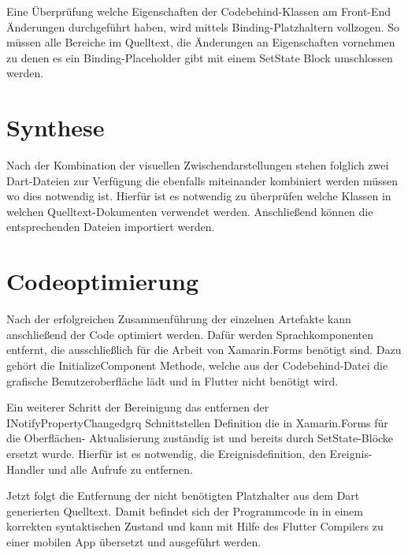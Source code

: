 Eine Überprüfung welche Eigenschaften der Codebehind-Klassen am Front-End Änderungen durchgeführt haben, wird mittels Binding-Platzhaltern vollzogen.  So müssen alle Bereiche im Quelltext, die Änderungen an Eigenschaften vornehmen zu denen es ein Binding-Placeholder gibt mit einem SetState Block umschlossen werden.

\section{Synthese}
Nach der Kombination der visuellen Zwischendarstellungen stehen folglich zwei Dart-Dateien zur Verfügung die ebenfalls miteinander kombiniert werden müssen wo dies notwendig ist.  Hierfür ist es notwendig zu überprüfen welche Klassen in welchen Quelltext-Dokumenten verwendet werden.  Anschließend können die entsprechenden Dateien importiert werden. 

\section{Codeoptimierung}

Nach der erfolgreichen Zusammenführung der einzelnen Artefakte kann anschließend der Code optimiert werden.  Dafür werden Sprachkomponenten entfernt,  die ausschließlich für die Arbeit von Xamarin.Forms benötigt sind.  Dazu gehört die \glq InitializeComponent\grq{} Methode,  welche aus der Codebehind-Datei die grafische Benutzeroberfläche lädt und in Flutter nicht benötigt wird.  

Ein weiterer Schritt der Bereinigung das entfernen der \glq INotifyPropertyChangedgrq{} Schnittstellen Definition die in Xamarin.Forms für die Oberflächen- Aktualisierung zuständig ist und bereits durch SetState-Blöcke ersetzt wurde.  Hierfür ist es notwendig,  die Ereignisdefinition, den Ereignis-Handler und alle Aufrufe zu entfernen.

Jetzt folgt die Entfernung der nicht benötigten Platzhalter aus dem Dart generierten Quelltext.  Damit befindet sich der Programmcode in in einem korrekten syntaktischen Zustand und kann mit Hilfe des Flutter Compilers zu einer mobilen App übersetzt und ausgeführt werden. 


